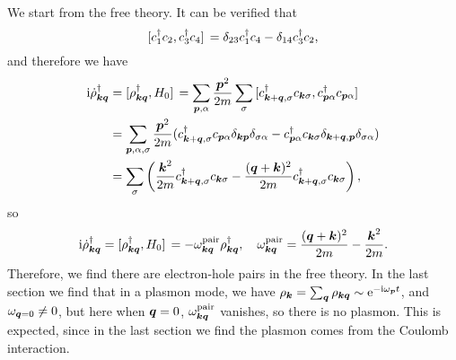 \documentclass[hyperref, a4paper]{article}
\newcommand*{\ii}{\mathrm{i}}
\newcommand*{\ee}{\mathrm{e}}
\begin{document}
We start from the free theory. It can be verified that 
\begin{equation}
    \comm*{c_1^\dagger c_2}{c_3^\dagger c_4} = \delta_{23} c_1^\dagger c_4 - \delta_{14} c_3^\dagger c_2,
\end{equation} 
and therefore we have 
\[
    \begin{aligned}
        \ii \dot{\rho}_{\vb*{k} \vb*{q}}^\dagger &= \comm*{{\rho}_{\vb*{k} \vb*{q}}^\dagger}{H_0} 
        = \sum_{\vb*{p}, \alpha} \frac{\vb*{p}^2}{2m} \sum_\sigma \comm*{c^\dagger_{\vb*{k} + \vb*{q}, \sigma} c_{\vb*{k} \sigma}}{c^\dagger_{\vb*{p} \alpha} c_{\vb*{p} \alpha}} \\
        &= \sum_{\vb*{p}, \alpha, \sigma} \frac{\vb*{p}^2}{2m} (c^\dagger_{\vb*{k} + \vb*{q}, \sigma} c_{\vb*{p} \alpha} \delta_{\vb*{k} \vb*{p}} \delta_{\sigma \alpha} - c^\dagger_{\vb*{p} \alpha} c_{\vb*{k} \sigma} \delta_{\vb*{k}+\vb*{q}, \vb*{p}} \delta_{\sigma \alpha}) \\
        &= \sum_{\sigma} \left( \frac{\vb*{k}^2}{2m} c^\dagger_{\vb*{k}+\vb*{q}, \sigma} c_{\vb*{k} \sigma} - \frac{(\vb*{q} + \vb*{k})^2}{2m} c^\dagger_{\vb*{k}+\vb*{q}, \sigma} c_{\vb*{k} \sigma} \right),
    \end{aligned}
\]
so 
\begin{equation}
    \ii \dot{\rho}^\dagger_{\vb*{k} \vb*{q}} = \comm*{\rho_{\vb*{k} \vb*{q}}^\dagger}{H_0} = - \omega^\text{pair}_{\vb*{k} \vb*{q}} {\rho}^\dagger_{\vb*{k} \vb*{q}}, 
    \quad \omega^\text{pair}_{\vb*{k} \vb*{q}} = \frac{(\vb*{q} + \vb*{k})^2}{2m} - \frac{\vb*{k}^2}{2m}.
\end{equation}
Therefore, we find there are electron-hole pairs in the free theory. In the last section we find that in a plasmon
mode, we have $\rho_{\vb*{k}} = \sum_{\vb*{q}} \rho_{\vb*{k} \vb*{q}} \sim \ee^{- \ii \omega_{\vb*{p}} t}$, 
and $\omega_{\vb*{q} = 0} \neq 0$, but here when $\vb*{q} = 0$, $\omega^\text{pair}
_{\vb*{k} \vb*{q}}$ vanishes, so there is no plasmon. This is expected, since in the last section we find 
the plasmon comes from the Coulomb interaction.
\end{document}
